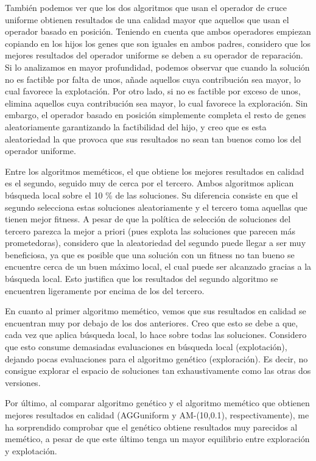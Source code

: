 \documentclass[10pt,a4paper]{article}
\begin{document}
También podemos ver que los dos algoritmos que usan el operador de cruce uniforme obtienen resultados de una calidad mayor que aquellos que usan el operador basado en posición. Teniendo en cuenta que ambos operadores empiezan copiando en los hijos los genes que son iguales en ambos padres, considero que los mejores resultados del operador uniforme se deben a su operador de reparación. Si lo analizamos en mayor profundidad, podemos observar que cuando la solución no es factible por falta de unos, añade aquellos cuya contribución sea mayor, lo cual favorece la explotación. Por otro lado, si no es factible por exceso de unos, elimina aquellos cuya contribución sea mayor, lo cual favorece la exploración. Sin embargo, el operador basado en posición simplemente completa el resto de genes aleatoriamente garantizando la factibilidad del hijo, y creo que es esta aleatoriedad la que provoca que sus resultados no sean tan buenos como los del operador uniforme.

Entre los algoritmos meméticos, el que obtiene los mejores resultados en calidad es el segundo, seguido muy de cerca por el tercero. Ambos algoritmos aplican búsqueda local sobre el 10 \% de las soluciones. Su diferencia consiste en que el segundo selecciona estas soluciones aleatoriamente y el tercero toma aquellas que tienen mejor fitness. A pesar de que la política de selección de soluciones del tercero parezca la mejor a priori (pues explota las soluciones que parecen más prometedoras), considero que la aleatoriedad del segundo puede llegar a ser muy beneficiosa, ya que es posible que una solución con un fitness no tan bueno se encuentre cerca de un buen máximo local, el cual puede ser alcanzado gracias a la búsqueda local. Esto justifica que los resultados del segundo algoritmo se encuentren ligeramente por encima de los del tercero.

En cuanto al primer algoritmo memético, vemos que sus resultados en calidad se encuentran muy por debajo de los dos anteriores. Creo que esto se debe a que, cada vez que aplica búsqueda local, lo hace sobre todas las soluciones. Considero que esto consume demasiadas evaluaciones en búsqueda local (explotación), dejando pocas evaluaciones para el algoritmo genético (exploración). Es decir, no consigue explorar el espacio de soluciones tan exhaustivamente como las otras dos versiones.

Por último, al comparar algoritmo genético y el algoritmo memético que obtienen mejores resultados en calidad (AGGuniform y AM-(10,0.1), respectivamente), me ha sorprendido comprobar que el genético obtiene resultados muy parecidos al memético, a pesar de que este último tenga un mayor equilibrio entre exploración y explotación.
\end{document}

